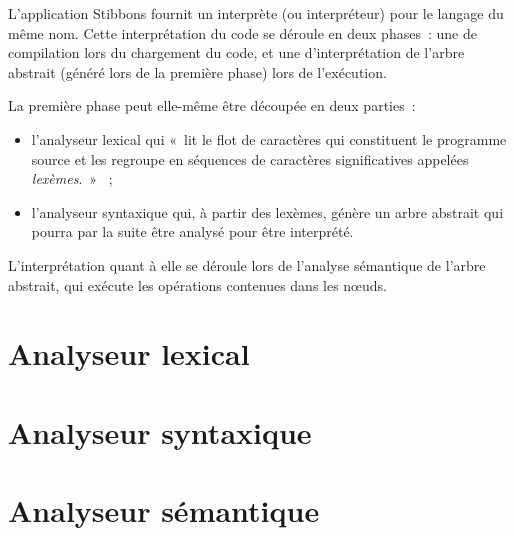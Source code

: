 L'application Stibbons fournit un interprète (ou interpréteur) pour le langage du même nom. Cette interprétation du code se déroule en deux phases~: une de compilation lors du chargement du code, et une d'interprétation de l'arbre abstrait (généré lors de la première phase) lors de l'exécution.

La première phase peut elle-même être découpée en deux parties~:
\begin{itemize}
\item l'analyseur lexical qui «~lit le flot de caractères qui constituent le programme source et les regroupe en séquences de caractères significatives appelées \emph{lexèmes}.~» \cite{compilateurs}~;
\item l'analyseur syntaxique qui, à partir des lexèmes, génère un arbre abstrait qui pourra par la suite être analysé pour être interprété.
\end{itemize}

L'interprétation quant à elle se déroule lors de l'analyse sémantique de l'arbre abstrait, qui exécute les opérations contenues dans les nœuds.

\section{Analyseur lexical}
\label{analyse-lexicale}


\section{Analyseur syntaxique}
\label{analyse-syntaxique}


\section{Analyseur sémantique}

